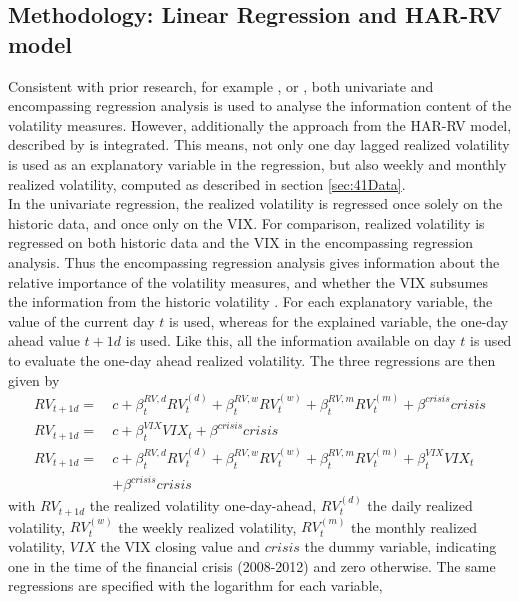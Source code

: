 \subsection{Methodology: Linear Regression and HAR-RV model}\label{sec:42Method}
Consistent with prior research, for example \textcite{jiang2003}, \textcite{canina1993} or \textcite{christensen1998}, both univariate and encompassing regression analysis is used to analyse the information content of the volatility measures. However, additionally the approach from the HAR-RV model, described by \textcite{corsi2009} is integrated. This means, not only one day lagged realized volatility is used as an explanatory variable in the regression, but also weekly and monthly realized volatility, computed as described in section \ref{sec:41Data}.\\
In the univariate regression, the realized volatility is regressed once solely on the historic data, and once only on the \ac{VIX}. For comparison, realized volatility is regressed on both historic data and the \ac{VIX} in the encompassing regression analysis. Thus the encompassing regression analysis gives information about the relative importance of the volatility measures, and whether the \ac{VIX} subsumes the information from the historic volatility \parencite{jiang2003}. For each explanatory variable, the value of the current day $t$ is used, whereas for the explained variable, the one-day ahead value $t+1d$ is used. Like this, all the information available on day $t$ is used to evaluate the one-day ahead realized volatility. The three regressions are then given by
\begin{align}
RV_{t+1d} = \ &c + \beta^{RV,d}_{t} RV^{(d)}_{t} + \beta^{RV,w}_{t} RV^{(w)}_{t} + \beta^{RV,m}_{t} RV^{(m)}_{t} + \beta^{crisis} crisis \tag{Reg1a}  \label{eq:Reg1a}\\
RV_{t+1d} = \ &c + \beta^{VIX}_{t} VIX_{t} + \beta^{crisis} crisis  \tag{Reg2a}  \label{eq:Reg2a}\\
RV_{t+1d} = \ &c + \beta^{RV,d}_{t} RV^{(d)}_{t} + \beta^{RV,w}_{t} RV^{(w)}_{t} + \beta^{RV,m}_{t} RV^{(m)}_{t} + \beta^{VIX}_{t} VIX_{t}  \nonumber \\
& + \beta^{crisis} crisis  \tag{Reg3a}  \label{eq:Reg3a}
\end{align}
with $RV_{t+1d}$ the realized volatility one-day-ahead, $RV^{(d)}_{t}$ the daily realized volatility, $RV^{(w)}_{t}$ the weekly realized volatility, $RV^{(m)}_{t}$ the monthly realized volatility, $VIX$ the \ac{VIX} closing value and $crisis$ the dummy variable, indicating one in the time of the financial crisis (2008-2012) and zero otherwise. The same regressions are specified with the logarithm for each variable,
